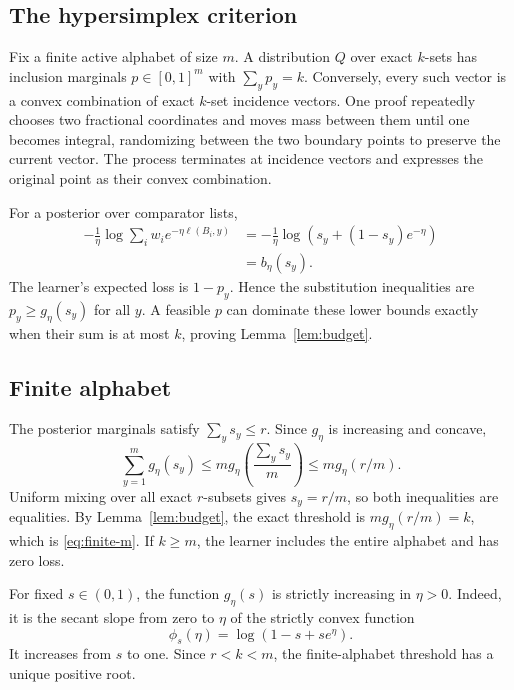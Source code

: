 \documentclass{article}
\theoremstyle{definition}
\theoremstyle{remark}
\newcommand{\1}{\mathbf 1}
\begin{document}
\subsection{The hypersimplex criterion}

Fix a finite active alphabet of size \(m\). A distribution \(Q\) over exact \(k\)-sets has inclusion marginals \(p\in[0,1]^m\) with \(\sum_yp_y=k\). Conversely, every such vector is a convex combination of exact \(k\)-set incidence vectors. One proof repeatedly chooses two fractional coordinates and moves mass between them until one becomes integral, randomizing between the two boundary points to preserve the current vector. The process terminates at incidence vectors and expresses the original point as their convex combination.

For a posterior over comparator lists,
\begin{align*}
-\frac1\eta\log\sum_iw_i e^{-\eta\ell(B_i,y)}
&=-\frac1\eta\log\left(s_y+(1-s_y)e^{-\eta}\right)\\
&=b_\eta(s_y).
\end{align*}
The learner's expected loss is \(1-p_y\). Hence the substitution inequalities are \(p_y\ge g_\eta(s_y)\) for all \(y\). A feasible \(p\) can dominate these lower bounds exactly when their sum is at most \(k\), proving Lemma~\ref{lem:budget}.

\subsection{Finite alphabet}

The posterior marginals satisfy \(\sum_ys_y\le r\). Since \(g_\eta\) is increasing and concave,
\begin{equation}
\label{eq:jensen-m}
\sum_{y=1}^m g_\eta(s_y)
\le m g_\eta\left(\frac{\sum_ys_y}{m}\right)
\le m g_\eta(r/m).
\end{equation}
Uniform mixing over all exact \(r\)-subsets gives \(s_y=r/m\), so both inequalities are equalities. By Lemma~\ref{lem:budget}, the exact threshold is \(m g_\eta(r/m)=k\), which is \eqref{eq:finite-m}. If \(k\ge m\), the learner includes the entire alphabet and has zero loss.

For fixed \(s\in(0,1)\), the function \(g_\eta(s)\) is strictly increasing in \(\eta>0\). Indeed, it is the secant slope from zero to \(\eta\) of the strictly convex function \[ \phi_s(\eta)=\log(1-s+se^\eta). \] It increases from \(s\) to one. Since \(r<k<m\), the finite-alphabet threshold has a unique positive root.
\end{document}
